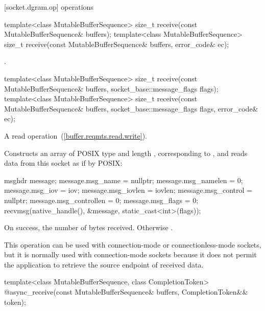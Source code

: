 [socket.dgram.op]{ operations}

\begin{itemdecl}
template<class MutableBufferSequence>
  size_t receive(const MutableBufferSequence& buffers);
template<class MutableBufferSequence>
  size_t receive(const MutableBufferSequence& buffers,
                 error_code& ec);
\end{itemdecl}

\begin{itemdescr}
\pnum
\returns {}.
\end{itemdescr}

\begin{itemdecl}
template<class MutableBufferSequence>
  size_t receive(const MutableBufferSequence& buffers,
                 socket_base::message_flags flags);
template<class MutableBufferSequence>
  size_t receive(const MutableBufferSequence& buffers,
                 socket_base::message_flags flags, error_code& ec);
\end{itemdecl}

\begin{itemdescr}
\pnum
A read operation~(\ref{buffer.reqmts.read.write}).

\pnum
\effects Constructs an array  of POSIX type  and length , corresponding to , and reads data from this socket as if by POSIX:
\begin{codeblock}
msghdr message;
message.msg_name = nullptr;
message.msg_namelen = 0;
message.msg_iov = iov;
message.msg_iovlen = iovlen;
message.msg_control = nullptr;
message.msg_controllen = 0;
message.msg_flags = 0;
recvmsg(native_handle(), &message, static_cast<int>(flags));
\end{codeblock}


\pnum
\returns On success, the number of bytes received. Otherwise .

\pnum
 \begin{note} This operation can be used with connection-mode or connectionless-mode sockets, but it is normally used with connection-mode sockets because it does not permit the application to retrieve the source endpoint of received data. \end{note}
\end{itemdescr}

\begin{itemdecl}
template<class MutableBufferSequence, class CompletionToken>
  @\DEDUCED@ async_receive(const MutableBufferSequence& buffers,
                        CompletionToken&& token);
\end{itemdecl}

